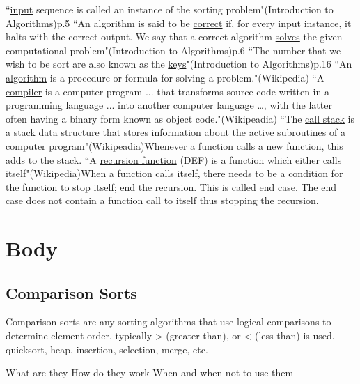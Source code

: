 \documentclass[12pt]{article}
\begin{document}
	``\underline{input} sequence is called an instance of the sorting problem"\;(Introduction to Algorithms)\;p.5\newline
	``An algorithm is said to be \underline{correct} if, for every input instance, it halts with the correct output. We say that a correct algorithm \underline{solves} the given computational problem"\;(Introduction to Algorithms)\;p.6\newline
	``The number that we wish to be sort are also known as the \underline{keys}"\;(Introduction to Algorithms)\;p.16\newline
	``An \underline{algorithm} is a procedure or formula for solving a problem."\;(Wikipedia)\;\newline
	``A \underline{compiler} is a computer program ... that transforms source code written in a programming language ... into another computer language …, with the latter often having a binary form known as object code."\;(Wikipeadia)\;\newline
	``The \underline{call stack} is a stack data structure that stores information about the active subroutines of a computer program"\;(Wikipeadia)\;Whenever a function calls a new function, this adds to the stack.\newline
	``A \underline{recursion function} (DEF) is a function which either calls itself"\;(Wikipedia)\;When a function calls itself, there needs to be a condition for the function to stop itself; end the recursion. This is called \underline{end case}. The end case does not contain a function call to itself thus stopping the recursion.\newline
	
	\section{Body}
	
	\subsection{Comparison Sorts}
	Comparison sorts are any sorting algorithms that use logical comparisons to determine element order, typically > (greater than), or < (less than)  is used.
	quicksort, heap, insertion, selection, merge, etc.
	

	
	What are they
	How do they work
	When and when not to use them
	
	
	
	
\end{document}
